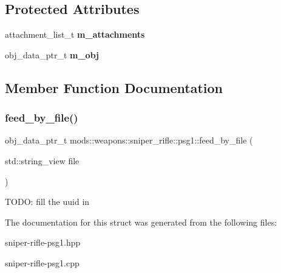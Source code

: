 \subsection*{Protected Attributes}
\begin{DoxyCompactItemize}
\item 
\mbox{\label{structmods_1_1weapons_1_1sniper__rifle_1_1psg1_a03a1dc01ded26688979a4a1dff05eaf4}} 
attachment\+\_\+list\+\_\+t {\bfseries m\+\_\+attachments}
\item 
\mbox{\label{structmods_1_1weapons_1_1sniper__rifle_1_1psg1_a0647730fa75ff2a21e4a568ef480a3c0}} 
obj\+\_\+data\+\_\+ptr\+\_\+t {\bfseries m\+\_\+obj}
\end{DoxyCompactItemize}


\subsection{Member Function Documentation}
\mbox{\label{structmods_1_1weapons_1_1sniper__rifle_1_1psg1_aea7a737419eddf516a916354f462d191}} 
\subsubsection{\texorpdfstring{feed\+\_\+by\+\_\+file()}{feed\_by\_file()}}
{\footnotesize\ttfamily obj\+\_\+data\+\_\+ptr\+\_\+t mods\+::weapons\+::sniper\+\_\+rifle\+::psg1\+::feed\+\_\+by\+\_\+file (\begin{DoxyParamCaption}\item[{std\+::string\+\_\+view}]{file }\end{DoxyParamCaption})\hspace{0.3cm}{\ttfamily [static]}}

T\+O\+DO\+: fill the uuid in 

The documentation for this struct was generated from the following files\+:\begin{DoxyCompactItemize}
\item 
sniper-\/rifle-\/psg1.\+hpp\item 
sniper-\/rifle-\/psg1.\+cpp\end{DoxyCompactItemize}
